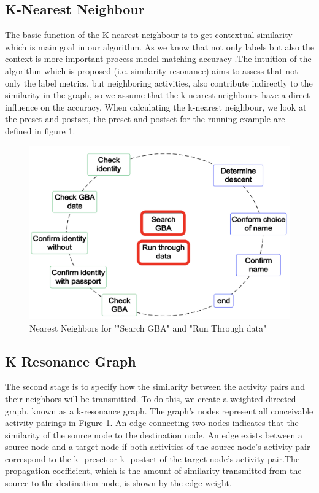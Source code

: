 \documentclass[runningheads]{llncs}
\begin{document}
\subsection{K-Nearest Neighbour}
The basic function of the  K-nearest neighbour is to get contextual similarity which is main goal in our algorithm. As we know that not only labels but also the context is more important process model matching accuracy \cite{ref17}.The intuition of the algorithm which is proposed (i.e. similarity resonance) aims to assess that not only the label metrics, but neighboring activities, also contribute indirectly to the similarity in the graph, so we assume that the k-nearest neighbours have a direct influence on the accuracy. When calculating the k-nearest neighbour, we look at the preset and postset, the preset and postset for the running example are defined in figure 1.
\begin{figure}
    \centering
    \includegraphics[width = \textwidth]{Figures/Fig_1.PNG}
    \caption{Nearest Neighbors for  '"Search GBA" and "Run Through data"}
    \label{fig:1}
\end{figure}


\subsection{K Resonance Graph}The second stage is to specify how the similarity between the activity pairs and their neighbors will be transmitted. To do this, we create a weighted directed graph, known as a k-resonance graph. The graph's nodes represent all conceivable activity pairings in Figure 1. An edge connecting two nodes indicates that the similarity of the source node to the destination node. An edge exists between a source node and a target node if both activities of the source node's activity pair correspond to the k -preset or k -postset of the target node's activity pair.The propagation coefficient, which is the amount of similarity transmitted from the source to the destination node, is shown by the edge weight\cite{ref11}.\newline
\end{document}
